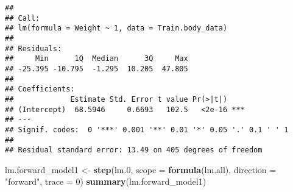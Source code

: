 \documentclass[
]{article}
\newenvironment{Shaded}{\begin{snugshade}}{\end{snugshade}}
\newcommand{\AttributeTok}[1]{\textcolor[rgb]{0.13,0.29,0.53}{#1}}
\newcommand{\DecValTok}[1]{\textcolor[rgb]{0.00,0.00,0.81}{#1}}
\newcommand{\FloatTok}[1]{\textcolor[rgb]{0.00,0.00,0.81}{#1}}
\newcommand{\FunctionTok}[1]{\textcolor[rgb]{0.13,0.29,0.53}{\textbf{#1}}}
\newcommand{\NormalTok}[1]{#1}
\newcommand{\OtherTok}[1]{\textcolor[rgb]{0.56,0.35,0.01}{#1}}
\newcommand{\StringTok}[1]{\textcolor[rgb]{0.31,0.60,0.02}{#1}}
\begin{document}
\begin{verbatim}
## 
## Call:
## lm(formula = Weight ~ 1, data = Train.body_data)
## 
## Residuals:
##     Min      1Q  Median      3Q     Max 
## -25.395 -10.795  -1.295  10.205  47.805 
## 
## Coefficients:
##             Estimate Std. Error t value Pr(>|t|)    
## (Intercept)  68.5946     0.6693   102.5   <2e-16 ***
## ---
## Signif. codes:  0 '***' 0.001 '**' 0.01 '*' 0.05 '.' 0.1 ' ' 1
## 
## Residual standard error: 13.49 on 405 degrees of freedom
\end{verbatim}

\begin{Shaded}
\begin{Highlighting}[]
\NormalTok{lm.forward\_model1 }\OtherTok{\textless{}{-}} \FunctionTok{step}\NormalTok{(lm}\FloatTok{.0}\NormalTok{, }\AttributeTok{scope =} \FunctionTok{formula}\NormalTok{(lm.all), }\AttributeTok{direction =} \StringTok{"forward"}\NormalTok{, }\AttributeTok{trace =} \DecValTok{0}\NormalTok{)}
\FunctionTok{summary}\NormalTok{(lm.forward\_model1)}
\end{Highlighting}
\end{Shaded}
\end{document}
